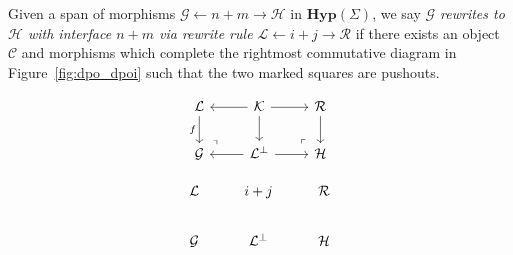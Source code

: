 \begin{definition}\label{def:dpoi}
Given a span of morphisms $\mathcal G \xleftarrow{} n+m \xrightarrow{} \mathcal H$ in $\textbf{Hyp}(\Sigma)$,  we say \textit{$\mathcal G$ rewrites to $\mathcal H$ with interface $n+m$ via rewrite rule $\mathcal L \xleftarrow{} i+j \xrightarrow{} \mathcal R$} if there exists an object $\mathcal C$ and morphisms which complete the rightmost commutative diagram in Figure~\ref{fig:dpo_dpoi} such that the two marked squares are pushouts.
\begin{figure}[t!]
    \begin{subfigure}[T]{0.4\linewidth}
    \[
                \begin{tikzcd}
                    {\mathcal{L}} & {\mathcal{K}} & {\mathcal{R}} \\
                    {\mathcal{G}} & {\mathcal{L}^{\bot}} & {\mathcal{H}}
                    \arrow["f"', from=1-1, to=2-1]
                    \arrow[from=1-2, to=1-1]
                    \arrow[from=1-2, to=1-3]
                    \arrow[from=1-2, to=2-2]
                    \arrow[from=1-3, to=2-3]
                    \arrow["\lrcorner"{anchor=center, pos=0.125, rotate=90}, draw=none, from=2-1, to=1-2]
                    \arrow[from=2-2, to=2-1]
                    \arrow[from=2-2, to=2-3]
                    \arrow["\lrcorner"{anchor=center, pos=0.125, rotate=180}, draw=none, from=2-3, to=1-2]
                \end{tikzcd}
    \]
    \end{subfigure}
    \hfill
    \begin{subfigure}[T]{0.4\linewidth}
        \[
    \begin{tikzcd}
        {\mathcal{L}} & {i+j} & {\mathcal{R}} \\
        {\mathcal{G}} & {\mathcal{L}^{\bot}} & {\mathcal{H}} \\

\end{tikzcd}\]
\end{subfigure}
\end{figure}
\end{definition}
